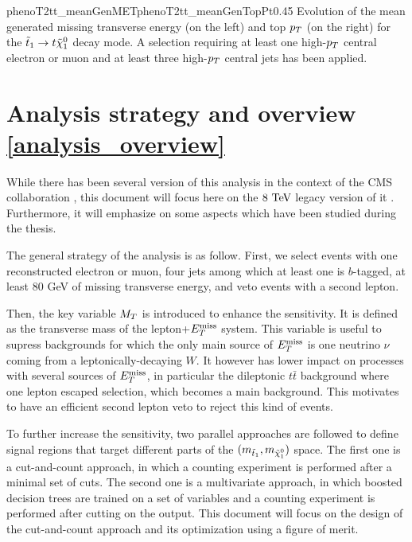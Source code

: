                      {phenoT2tt_meanGenMET}{phenoT2tt_meanGenTopPt}{0.45}
                     {Evolution of the mean generated missing transverse energy (on the left) 
                     and top $p_T$ (on the right) for the $\tilde{t}_1 \rightarrow t \tilde{\chi}_1^0$ 
                     decay mode. A selection requiring at least one high-$p_T$ central 
                     electron or muon and at least three high-$p_T$ central jets has been 
                     applied.}
    
    \section{Analysis strategy and overview \ref{analysis_overview}}
   
    While there has been several version of this analysis in the context of the CMS 
    collaboration \cite{SUS-12-023-PAS, SUS-13-011-PUB, SUS-14-015-PAS}, this document 
    will focus here on the $8~\text{TeV}$ legacy version of it \cite{SUS-14-015-PAS}. Furthermore, 
    it will emphasize on some aspects which have been studied during the thesis.

    The general strategy of the analysis is as follow. First, we select events with one 
    reconstructed electron or muon, four jets among which at least one is $b$-tagged, 
    at least 80 GeV of missing transverse energy, and veto events with a second lepton. 

    Then, the key variable $M_T$ is introduced to enhance the sensitivity. It is defined as 
    the transverse mass of the lepton+$E_T^\text{miss}$ system. This variable is useful to supress
    backgrounds for which the only main source of $E_T^\text{miss}$ is one neutrino $\nu$ 
    coming from a leptonically-decaying $W$. It however has lower impact on processes with 
    several sources of $E_T^\text{miss}$, in particular the dileptonic $t\bar{t}$ background where one 
    lepton escaped selection, which becomes a main background. This motivates to have an 
    efficient second lepton veto to reject this kind of events.

    To further increase the sensitivity, two parallel approaches are followed to define
    signal regions that target different parts of the $(m_{\tilde{t}_1},m_{\tilde{\chi}_1^0})$
    space. The first one is a cut-and-count approach, in which a counting experiment is performed 
    after a minimal set of cuts. The second one is a multivariate approach, in which boosted 
    decision trees are trained on a set of variables and a counting experiment is performed 
    after cutting on the output. This document will focus on the design of the cut-and-count
    approach and its optimization using a figure of merit.

